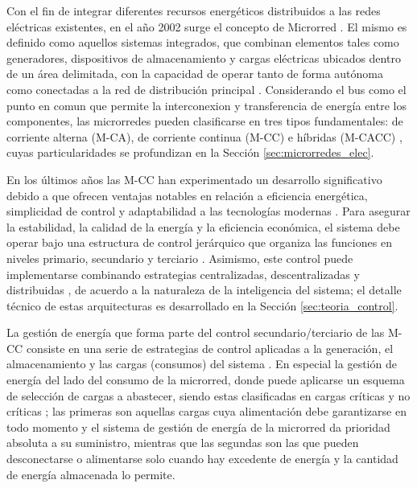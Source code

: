 Con el fin de integrar diferentes recursos energéticos distribuidos a las redes eléctricas existentes, en el año 2002 surge el concepto de Microrred \cite{Lasseter2002}. El mismo es definido como aquellos sistemas integrados, que combinan elementos tales como generadores, dispositivos de almacenamiento y cargas eléctricas ubicados dentro de un área delimitada, con la capacidad de operar tanto de forma autónoma como conectadas a la red de distribución principal \cite{Olulope2022, Uddin2023, Zidane2025}. Considerando el bus como el punto en comun que permite la interconexion y transferencia de energía entre los componentes, las microrredes pueden clasificarse en tres tipos fundamentales: de corriente alterna (M-CA), de corriente continua (M-CC) e híbridas (M-CACC) \cite{Kim2023, Lei2025}, cuyas particularidades se profundizan en la Sección \ref{sec:microrredes_elec}.

En los últimos años las M-CC han experimentado un desarrollo significativo debido a que ofrecen ventajas notables en relación a eficiencia energética, simplicidad de control y adaptabilidad a las tecnologías modernas \cite{Mittal2022}. Para asegurar la estabilidad, la calidad de la energía y la eficiencia económica, el sistema debe operar bajo una estructura de control jerárquico que organiza las funciones en niveles primario, secundario y terciario \cite{Shuai2018, Adegboyega2025}. Asimismo, este control puede implementarse combinando estrategias centralizadas, descentralizadas y distribuidas \cite{AlIsmail2021, Ahmad2025}, de acuerdo a la naturaleza de la inteligencia del sistema; el detalle técnico de estas arquitecturas es desarrollado en la Sección \ref{sec:teoria_control}.

La gestión de energía que forma parte del control secundario/terciario de las M-CC consiste en una serie de estrategias de control aplicadas a la generación, el almacenamiento y las cargas (consumos) del sistema \cite{Shafiullah2022, Alidrissi2021, Li2025, Lee2021, Panda2025}. En especial la gestión de energía del lado del consumo de la microrred, donde puede aplicarse un esquema de selección de cargas a abastecer, siendo estas clasificadas en cargas críticas y no críticas \cite{Elmorshedy2023}; las primeras son aquellas cargas cuya alimentación debe garantizarse en todo momento y el sistema de gestión de energía de la microrred da prioridad absoluta a su suministro, mientras que las segundas son las que pueden desconectarse o alimentarse solo cuando hay excedente de energía y la cantidad de energía almacenada lo permite.

